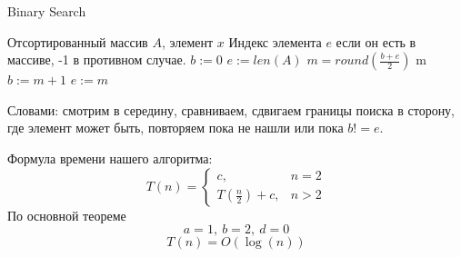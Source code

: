 \documentclass[../book.tex]{subfiles}
\begin{document}
	\begin{algorithm}[H]
		\caption{Binary Search}
		\begin{algorithmic}[1]
			\Require Отсортированный массив $A$, элемент $x$
			\Ensure Индекс элемента $e$ если он есть в массиве, -1 в противном случае.
				\State $b := 0$
				\State $e := len(A)$
					\State $m = round(\frac{b + e}{2})$
						\State \Return m
						\State $b := m + 1$
					\Else
						\State $e := m$
					\EndIf
				\EndWhile
				\State {}
			\EndFunction
		\end{algorithmic}
	\end{algorithm}
	
	Словами: смотрим в середину, сравниваем, сдвигаем границы поиска в сторону, где элемент может быть, повторяем пока не нашли или пока $b != e$.
	
	
	\begin{time}
		Формула времени нашего алгоритма:
		\[
		T(n) = 
		\begin{cases}
			c, & n = 2 \\
			T(\frac{n}{2}) + c, & n > 2
		\end{cases}
		\]
		По основной теореме 
		\[
		a = 1, \ b = 2, \ d = 0
		\]
		\[
		T(n) = O(\log(n))
		\]
	\end{time}
	
	
	
	\pagebreak
	
\end{document}
